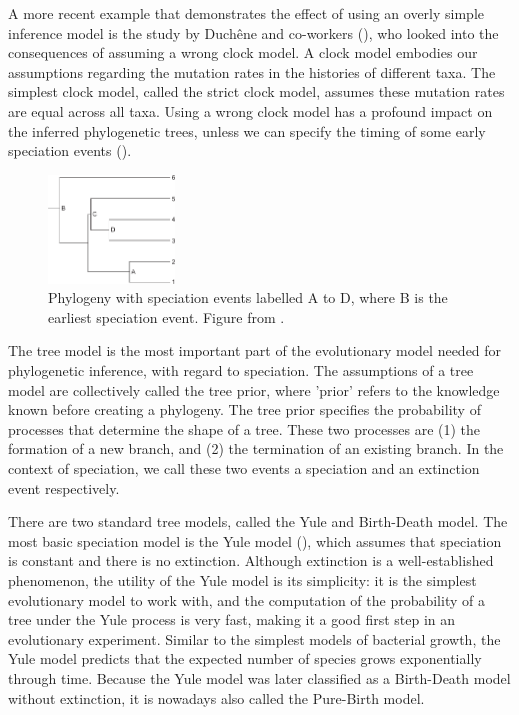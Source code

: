A more recent example that demonstrates the effect of using an overly simple 
inference model is the study by Duchêne and co-workers (\cite{duchene2014impact}),
who looked into the consequences of assuming a wrong clock model. 
A clock model embodies our assumptions regarding the mutation rates in
the histories of different taxa. The simplest clock model, called the strict
clock model, assumes these mutation rates are equal across all taxa.
Using a wrong clock model has a profound impact 
on the inferred phylogenetic trees, unless we can
specify the timing of some early speciation 
events (\cite{duchene2014impact}).

\begin{figure}[H]
  \includegraphics[width=0.3\textwidth]{duchene_et_al_2014_fig_1.png}
  \caption{
    Phylogeny with speciation events labelled A to D,
    where B is the earliest speciation event.
    Figure from \cite{duchene2014impact}.
 }
  \label{fig:duchene2014impact}
\end{figure}

The tree model is the most important part of the evolutionary model needed for phylogenetic inference,
with regard to speciation. The assumptions of a tree model are collectively 
called the tree prior, where 'prior' refers to the knowledge
known before creating a phylogeny. The tree prior specifies the probability of
processes that determine the shape of a tree. These
two processes are (1) the formation of a new branch, 
and (2) the termination of
an existing branch. In the context of speciation, we call these
two events a speciation and an extinction event respectively.

There are two standard tree models, called the Yule
and Birth-Death model. The most basic speciation model
is the Yule model (\cite{yule1925mathematical}), 
which assumes that speciation
is constant and there is no extinction.
Although extinction is a well-established phenomenon, 
the utility of the Yule model is its simplicity: it is the
simplest evolutionary model to work with, and the computation
of the probability of a tree under the Yule process is very fast,
making it a good first step in an evolutionary experiment.
Similar to the simplest models of bacterial growth,
the Yule model predicts that the expected number of species 
grows exponentially through time.
Because the Yule model 
was later classified as a Birth-Death model without extinction,
it is nowadays also called the Pure-Birth model.

